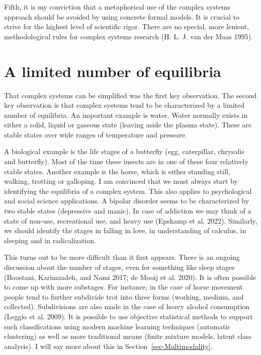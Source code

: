 \documentclass[
  a4paper,
  DIV=11,
  numbers=noendperiod]{scrreprt}
\begin{document}
Fifth, it is my conviction that a metaphorical use of the complex
systems approach should be avoided by using concrete formal models. It
is crucial to strive for the highest level of scientific rigor. There
are no special, more lenient, methodological rules for complex systems
research (H. L. J. van der Maas 1995).

\hypertarget{sec-A-limited-number-of-equilibria}{%
\section{A limited number of
equilibria}\label{sec-A-limited-number-of-equilibria}}

That complex systems can be simplified was the first key observation.
The second key observation is that complex systems tend to be
characterized by a limited number of equilibria. An important example is
water. Water normally exists in either a solid, liquid or gaseous state
(leaving aside the plasma state). These are stable states over wide
ranges of temperature and pressure.

A biological example is the life stages of a butterfly (egg,
caterpillar, chrysalis and butterfly). Most of the time these insects
are in one of these four relatively stable states. Another example is
the horse, which is either standing still, walking, trotting or
galloping. I am convinced that we must always start by identifying the
equilibria of a complex system. This also applies to psychological and
social science applications. A bipolar disorder seems to be
characterized by two stable states (depressive and manic). In case of
addiction we may think of a state of non-use, recreational use, and
heavy use (Epskamp et al. 2022). Similarly, we should identify the
stages in falling in love, in understanding of calculus, in sleeping and
in radicalization.

This turns out to be more difficult than it first appears. There is an
ongoing discussion about the number of stages, even for something like
sleep stages (Boostani, Karimzadeh, and Nami 2017; de Mooij et al.
2020). It is often possible to come up with more substages. For
instance, in the case of horse movement people tend to further subdivide
trot into three forms (working, medium, and collected). Subdivisions are
also made in the case of heavy alcohol consumption (Leggio et al. 2009).
It is possible to use objective statistical methods to support such
classifications using modern machine learning techniques (automatic
clustering) as well as more traditional means (finite mixture models,
latent class analysis). I will say more about this in
Section~\ref{sec-Multimodality}.
\end{document}
